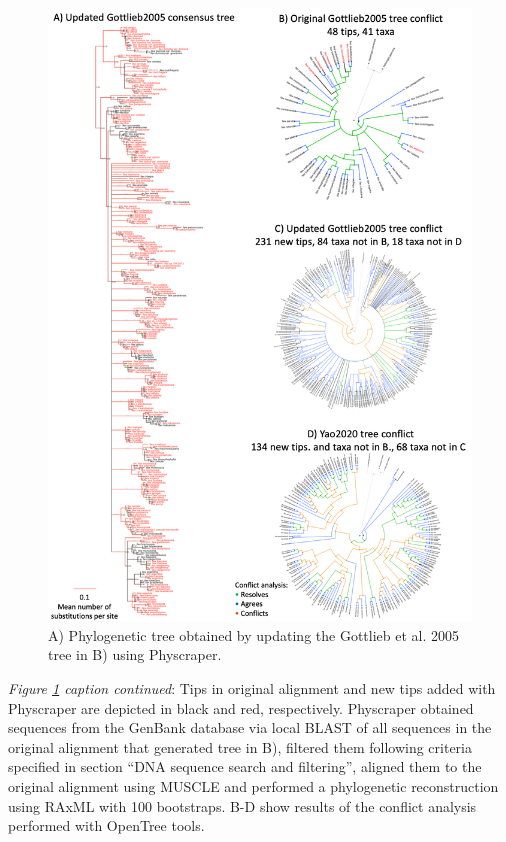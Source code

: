 \documentclass[]{article}
\begin{document}
\begin{figure}
\includegraphics[width=1\linewidth]{docs/figs/ilex-results} \caption{A) Phylogenetic tree obtained by updating the Gottlieb et al. 2005 tree in B) using Physcraper.}\label{fig:results}
\end{figure}

\newpage

\emph{Figure \ref{fig:results} caption continued}: Tips in original alignment and new tips added with Physcraper are depicted in black and red, respectively. Physcraper obtained sequences from the GenBank database via local BLAST of all sequences in the original alignment that generated tree in B), filtered them following criteria specified in section ``DNA sequence search and filtering'', aligned them to the original alignment using MUSCLE and performed a phylogenetic reconstruction using RAxML with 100 bootstraps. B-D show results of the conflict analysis performed with OpenTree tools.
\end{document}
